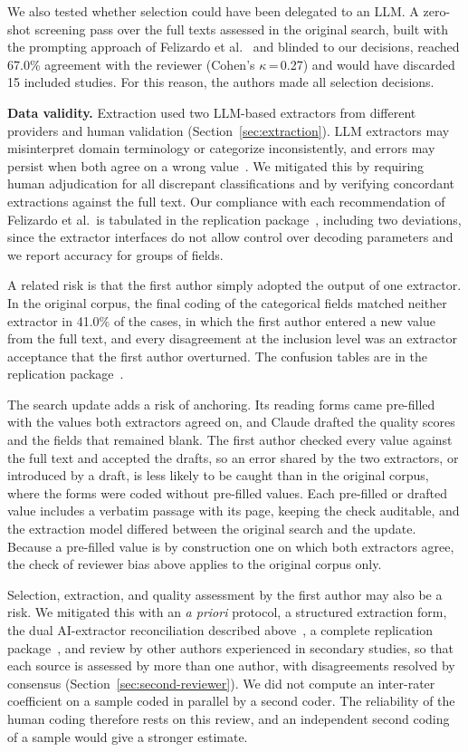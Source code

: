 \documentclass[preprint,number]{elsarticle}
\begin{document}
We also tested whether selection could have been delegated to an LLM. A zero-shot screening pass over the full texts assessed in the original search, built with the prompting approach of Felizardo et al.~\cite{felizardo2024llm} and blinded to our decisions, reached 67.0\% agreement with the reviewer (Cohen's $\kappa$\,=\,0.27) and would have discarded 15 included studies. For this reason, the authors made all selection decisions.

\textbf{Data validity.}
Extraction used two LLM-based extractors from different providers and human validation (Section~\ref{sec:extraction}). LLM extractors may misinterpret domain terminology or categorize inconsistently, and errors may persist when both agree on a wrong value~\cite{felizardo2024llm}. We mitigated this by requiring human adjudication for all discrepant classifications and by verifying concordant extractions against the full text. Our compliance with each recommendation of Felizardo et al.\ is tabulated in the replication package~\cite{replication2026}, including two deviations, since the extractor interfaces do not allow control over decoding parameters and we report accuracy for groups of fields.

A related risk is that the first author simply adopted the output of one extractor. In the original corpus, the final coding of the categorical fields matched neither extractor in 41.0\% of the cases, in which the first author entered a new value from the full text, and every disagreement at the inclusion level was an extractor acceptance that the first author overturned. The confusion tables are in the replication package~\cite{replication2026}.

The search update adds a risk of anchoring. Its reading forms came pre-filled with the values both extractors agreed on, and Claude drafted the quality scores and the fields that remained blank. The first author checked every value against the full text and accepted the drafts, so an error shared by the two extractors, or introduced by a draft, is less likely to be caught than in the original corpus, where the forms were coded without pre-filled values. Each pre-filled or drafted value includes a verbatim passage with its page, keeping the check auditable, and the extraction model differed between the original search and the update. Because a pre-filled value is by construction one on which both extractors agree, the check of reviewer bias above applies to the original corpus only.

Selection, extraction, and quality assessment by the first author may also be a risk. We mitigated this with an \textit{a priori} protocol, a structured extraction form, the dual AI-extractor reconciliation described above~\cite{felizardo2024llm}, a complete replication package~\cite{replication2026}, and review by other authors experienced in secondary studies, so that each source is assessed by more than one author, with disagreements resolved by consensus (Section~\ref{sec:second-reviewer}). We did not compute an inter-rater coefficient on a sample coded in parallel by a second coder. The reliability of the human coding therefore rests on this review, and an independent second coding of a sample would give a stronger estimate.
\end{document}
